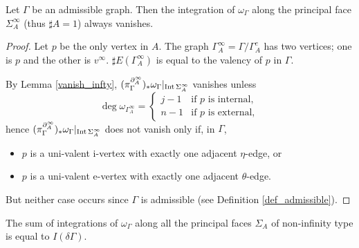 \begin{thm}\label{infty_principal}
Let $\Gamma$ be an admissible graph.
Then the integration of $\omega_{\Gamma}$ along the principal face $\Sigma^{\infty}_A$ (thus $\sharp A =1$) always
vanishes.
\end{thm}


\begin{proof}
Let $p$ be the only vertex in $A$.
The graph $\Gamma^{\infty}_A =\Gamma / \Gamma^c_A$ has two vertices; one is $p$ and the other is $v^{\infty}$.
$\sharp E(\Gamma^{\infty}_A )$ is equal to the valency of $p$ in $\Gamma$.


By Lemma \ref{vanish_infty}, $(\pi^{\partial^{\infty}_A}_{\Gamma})_* \omega_{\Gamma}|_{\mathrm{Int}\, \Sigma^{\infty}_A}$
vanishes unless
\[
 \deg \omega_{\Gamma^{\infty}_A}=
 \begin{cases}
  j-1 & \text{if } p \text{ is internal}, \\
  n-1 & \text{if } p \text{ is external},
 \end{cases}
\]
hence $(\pi^{\partial^{\infty}_A}_{\Gamma})_* \omega_{\Gamma}|_{\mathrm{Int}\, \Sigma^{\infty}_A}$ does not vanish only if,
in $\Gamma$,
\begin{itemize}
\item $p$ is a uni-valent i-vertex with exactly one adjacent $\eta$-edge, or
\item $p$ is a uni-valent e-vertex with exactly one adjacent $\theta$-edge.
\end{itemize}
But neither case occurs since $\Gamma$ is admissible (see Definition \ref{def_admissible}).
\end{proof}


\begin{thm}\label{3.1_first_half}
The sum of integrations of $\omega_{\Gamma}$ along all the principal faces $\Sigma_A$ of non-infinity type is equal to
$I(\delta \Gamma )$.
\end{thm}


